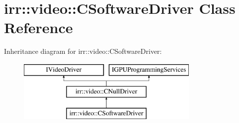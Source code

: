 \hypertarget{classirr_1_1video_1_1_c_software_driver}{\section{irr\-:\-:video\-:\-:C\-Software\-Driver Class Reference}
\label{classirr_1_1video_1_1_c_software_driver}
}
Inheritance diagram for irr\-:\-:video\-:\-:C\-Software\-Driver\-:\begin{figure}[H]
\begin{center}
\leavevmode
\includegraphics[height=3.000000cm]{classirr_1_1video_1_1_c_software_driver}
\end{center}
\end{figure}
